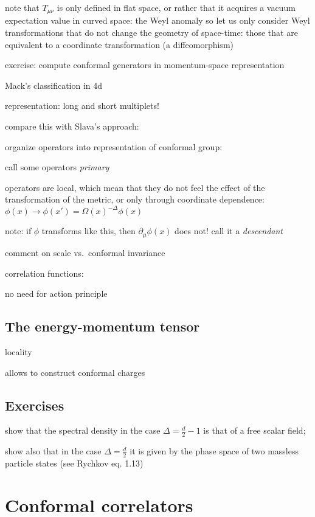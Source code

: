 \documentclass[a4paper,12pt]{article}
\numberwithin{equation}{section}
\begin{document}
note that $T_{\mu\nu}$ is only defined in flat space, or rather that it acquires a vacuum expectation value in curved space: the Weyl anomaly
so let us only consider Weyl transformations that do not change the geometry of space-time: those that are equivalent to a coordinate transformation (a diffeomorphism)


exercise: compute conformal generators in momentum-space representation


Mack's classification in 4d


representation: long and short multiplets!




compare this with Slava's approach:

organize operators into representation of conformal group:

call some operators \emph{primary}

operators are local, which mean that they do not feel the effect of the transformation of the metric, or only through coordinate dependence:
$\phi(x) \to \phi(x') = \Omega(x)^{-\Delta} \phi(x)$

note: if $\phi$ transforms like this, then $\partial_\mu \phi(x)$ does not! call it a \emph{descendant}


comment on scale vs.~conformal invariance

correlation functions:

no need for action principle


\subsection{The energy-momentum tensor}


locality

allows to construct conformal charges


\subsection{Exercises}

show that the spectral density in the case $\Delta = \frac{d}{2} - 1$ is that of a free scalar field;

show also that in the case $\Delta = \frac{d}{2}$ it is given by the phase space of two massless particle states (see Rychkov eq. 1.13)



\section{Conformal correlators}
\end{document}
